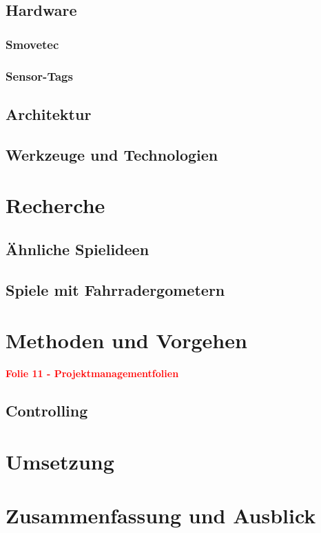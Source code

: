 \section{Hardware}
\subsection{Smovetec}
\subsection{Sensor-Tags}
\section{Architektur}
\section{Werkzeuge und Technologien}
 
\chapter{Recherche}
\section{Ähnliche Spielideen}
\section{Spiele mit Fahrradergometern}


\chapter{Methoden und Vorgehen}
\textcolor{red}{\textbf{Folie 11 - Projektmanagementfolien}}
\section{Controlling}



\chapter{Umsetzung}

\chapter{Zusammenfassung und Ausblick}